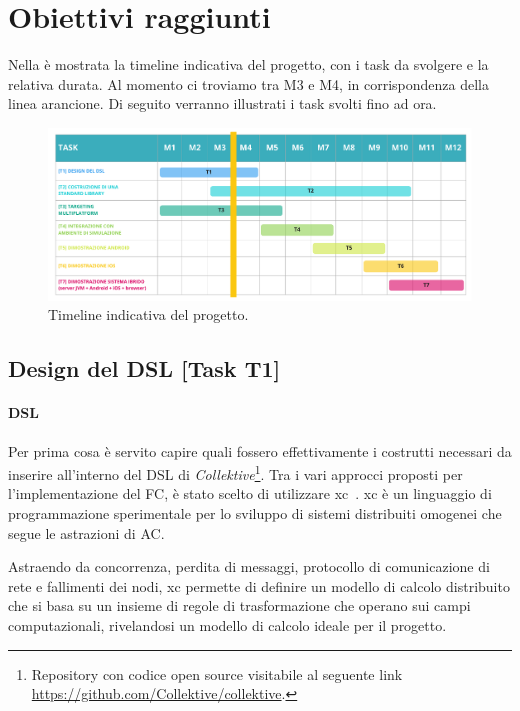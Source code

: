 \documentclass[13pt, a4paper]{article}
\newcommand{\ck}{\emph{Collektive}}
\begin{document}
\section{Obiettivi raggiunti}\label{sec:obiettivi-raggiunti}

Nella  è mostrata la timeline indicativa del progetto, con i task da svolgere e la relativa durata.
%
Al momento ci troviamo tra M3 e M4, in corrispondenza della linea arancione.
%
Di seguito verranno illustrati i task svolti fino ad ora.

\begin{figure}
    \centering
    \includegraphics[width=\textwidth]{images/collektive_timeline}
    \caption{Timeline indicativa del progetto.}
    \label{fig:timeline}
\end{figure}

\subsection{Design del DSL [Task T1]}\label{subsec:t1}

\paragraph{DSL}
Per prima cosa è servito capire quali fossero effettivamente i costrutti necessari da inserire all'interno del DSL di \ck{}\footnote{
    Repository con codice open source visitabile al seguente link \url{https://github.com/Collektive/collektive}.
}.
%
Tra i vari approcci proposti per l'implementazione del \ac{FC}, è stato scelto di utilizzare \ac{xc}~\cite{AudritoCDSV24}.
%
\ac{xc} è un linguaggio di programmazione sperimentale per lo sviluppo di sistemi distribuiti omogenei che segue le astrazioni
    di \ac{AC}.

Astraendo da concorrenza, perdita di messaggi, protocollo di comunicazione di rete e fallimenti dei nodi,
    \ac{xc} permette di definire un modello di calcolo distribuito che si basa su un insieme di regole di trasformazione
    che operano sui campi computazionali,
    rivelandosi un modello di calcolo ideale per il progetto.
\end{document}
